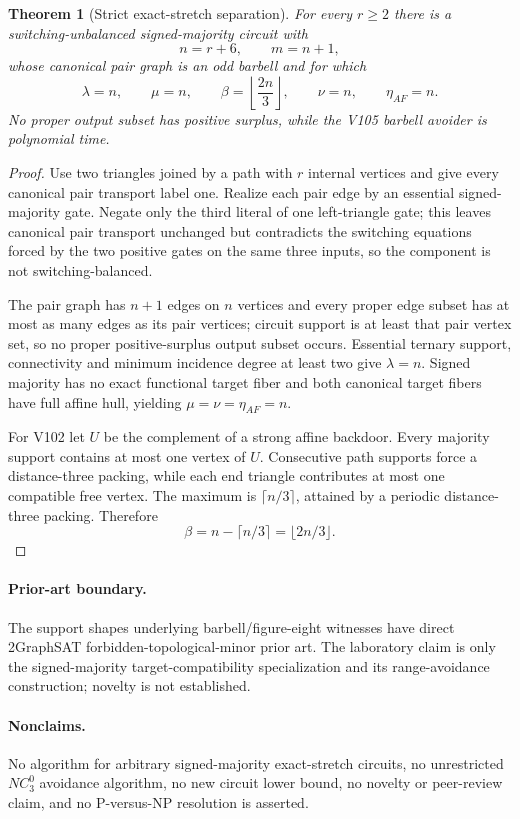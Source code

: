 \documentclass[11pt]{article}
\newtheorem{theorem}{Theorem}
\begin{document}
\begin{theorem}[Strict exact-stretch separation]
For every $r\ge2$ there is a switching-unbalanced signed-majority circuit with
\[
 n=r+6,\qquad m=n+1,
\]
whose canonical pair graph is an odd barbell and for which
\[
 \lambda=n,\qquad \mu=n,\qquad
 \beta=\left\lfloor\frac{2n}{3}\right\rfloor,\qquad
 \nu=n,\qquad \eta_{AF}=n.
\]
No proper output subset has positive surplus, while the V105 barbell avoider is
polynomial time.
\end{theorem}
\begin{proof}
Use two triangles joined by a path with $r$ internal vertices and give every
canonical pair transport label one.  Realize each pair edge by an essential
signed-majority gate.  Negate only the third literal of one left-triangle gate;
this leaves canonical pair transport unchanged but contradicts the switching
equations forced by the two positive gates on the same three inputs, so the
component is not switching-balanced.

The pair graph has $n+1$ edges on $n$ vertices and every proper edge subset has
at most as many edges as its pair vertices; circuit support is at least that pair
vertex set, so no proper positive-surplus output subset occurs.  Essential
ternary support, connectivity and minimum incidence degree at least two give
$\lambda=n$.  Signed majority has no exact functional target fiber and both
canonical target fibers have full affine hull, yielding $\mu=\nu=\eta_{AF}=n$.

For V102 let $U$ be the complement of a strong affine backdoor.  Every majority
support contains at most one vertex of $U$.  Consecutive path supports force a
distance-three packing, while each end triangle contributes at most one
compatible free vertex.  The maximum is $\lceil n/3\rceil$, attained by a
periodic distance-three packing.  Therefore
\[
 \beta=n-\lceil n/3\rceil=\lfloor2n/3\rfloor.
\]
\end{proof}

\paragraph{Prior-art boundary.}
The support shapes underlying barbell/figure-eight witnesses have direct
2GraphSAT forbidden-topological-minor prior art.  The laboratory claim is only
the signed-majority target-compatibility specialization and its range-avoidance
construction; novelty is not established.

\paragraph{Nonclaims.}
No algorithm for arbitrary signed-majority exact-stretch circuits, no
unrestricted $NC^0_3$ avoidance algorithm, no new circuit lower bound, no
novelty or peer-review claim, and no P-versus-NP resolution is asserted.
\end{document}
